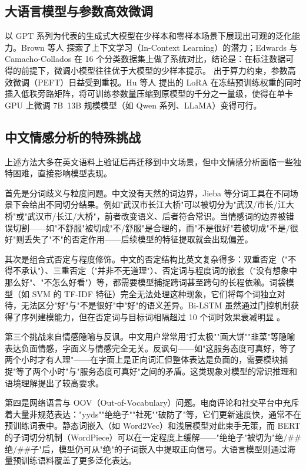 \subsection{大语言模型与参数高效微调}
以 GPT 系列为代表的生成式大模型在少样本和零样本场景下展现出可观的泛化能力。Brown 等人 \cite{brown2020language} 探索了上下文学习（In-Context Learning）的潜力；Edwards 与 Camacho-Collados \cite{edwards2024language} 在 16 个分类数据集上做了系统对比，结论是：在标注数据可得的前提下，微调小模型往往优于大模型的少样本提示。
出于算力约束，参数高效微调（PEFT）日益受到重视。Hu 等人 \cite{hu2021lora} 提出的 LoRA 在冻结预训练权重的同时插入低秩旁路矩阵，将可训练参数量压缩到原模型的千分之一量级，使得在单卡 GPU 上微调 7B~13B 规模模型（如 Qwen 系列、LLaMA\cite{touvron2023llama}）变得可行。

\subsection{中文情感分析的特殊挑战}

上述方法大多在英文语料上验证后再迁移到中文场景，但中文情感分析面临一些独特困难，直接影响模型表现。

首先是分词歧义与粒度问题。中文没有天然的词边界，Jieba 等分词工具在不同场景下会给出不同切分结果。例如"武汉市长江大桥"可以被切分为"武汉/市长/江大桥"或"武汉市/长江/大桥"，前者改变语义、后者符合常识。当情感词的边界被错误切割——如"不舒服"被切成"不/舒服"是合理的，而"不是很好"若被切成"不是/很好"则丢失了"不"的否定作用——后续模型的特征提取就会出现偏差。

其次是组合式否定与程度修饰。中文的否定结构比英文复杂得多：双重否定（"不得不承认"）、三重否定（"并非不无道理"）、否定词与程度词的嵌套（"没有想象中那么好"、"不怎么好看"）等，都需要模型捕捉跨词甚至跨句的长程依赖。词袋模型（如 SVM 的 TF-IDF 特征）完全无法处理这种现象，它们将每个词独立对待，无法区分"好"与"不是很好"中"好"的语义差异。Bi-LSTM 虽然通过门控机制获得了序列建模能力，但在否定词与目标词相隔超过 10 个词时效果衰减明显 \cite{li2014improving}。

第三个挑战来自情感隐喻与反讽。中文用户常常用"打太极""画大饼""韭菜"等隐喻表达负面情感，字面义与情感完全无关。反讽句——如"这服务态度可真好，等了两个小时才有人理"——在字面上是正向词汇但整体表达是负面的，需要模块捕捉"等了两个小时"与"服务态度可真好"之间的矛盾。这类现象对模型的常识推理和语境理解提出了较高要求。

第四是网络语言与 OOV（Out-of-Vocabulary）问题。电商评论和社交平台中充斥着大量非规范表达："yyds""绝绝子""社死""破防了"等，它们更新速度快，通常不在预训练词表中。静态词嵌入（如 Word2Vec）和浅层模型对此束手无策，而 BERT 的子词切分机制（WordPiece）可以在一定程度上缓解——"绝绝子"被切为"绝/\#\#绝/\#\#子"后，模型仍可从"绝"的子词嵌入中提取正向信号。大语言模型则通过海量预训练语料覆盖了更多泛化表达。

